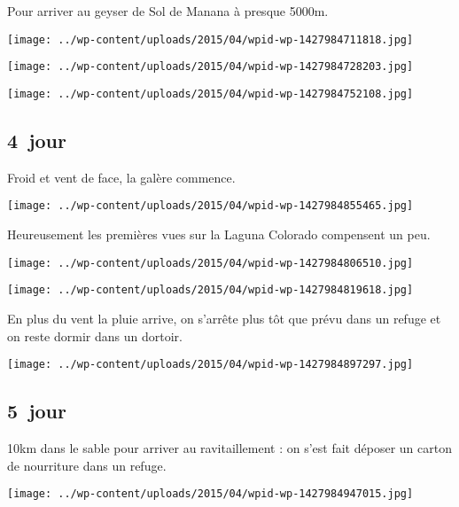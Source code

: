 \pagebreak
  Pour arriver au geyser de Sol de Manana à presque 5000m.
\begin{center} \texttt{[image: ../wp-content/uploads/2015/04/wpid-wp-1427984711818.jpg]} \end{center}
\begin{center} \texttt{[image: ../wp-content/uploads/2015/04/wpid-wp-1427984728203.jpg]} \end{center}
\begin{center} \texttt{[image: ../wp-content/uploads/2015/04/wpid-wp-1427984752108.jpg]} \end{center}

 \subsection*{4\ieme\ jour} 

 Froid et vent de face, la galère commence.
\begin{center} \texttt{[image: ../wp-content/uploads/2015/04/wpid-wp-1427984855465.jpg]} \end{center}
\vspace{-\topsep}

\pagebreak
 Heureusement les premières vues sur la Laguna Colorado compensent un peu.
\begin{center} \texttt{[image: ../wp-content/uploads/2015/04/wpid-wp-1427984806510.jpg]} \end{center}
\begin{center} \texttt{[image: ../wp-content/uploads/2015/04/wpid-wp-1427984819618.jpg]} \end{center}
\vspace{-\topsep}
\vspace{-3mm}

\pagebreak
 En plus du vent la pluie arrive, on s'arrête plus tôt que prévu dans un refuge et on reste dormir dans un dortoir.
\begin{center} \texttt{[image: ../wp-content/uploads/2015/04/wpid-wp-1427984897297.jpg]} \end{center}

 \subsection*{5\ieme\ jour} 

 10km dans le sable pour arriver au ravitaillement : on s'est fait déposer un carton de nourriture dans un refuge.
\begin{center} \texttt{[image: ../wp-content/uploads/2015/04/wpid-wp-1427984947015.jpg]} \end{center}

